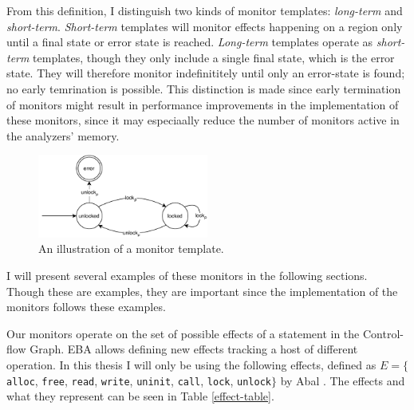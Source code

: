 \newpar From this definition, I distinguish two kinds of monitor templates: \textit{long-term} and \textit{short-term}. \textit{Short-term} templates will monitor effects happening on a region only until a final state or error state is reached. \textit{Long-term} templates operate as \textit{short-term} templates, though they only include a single final state, which is the error state. They will therefore monitor indefinititely until only an error-state is found; no early temrination is possible. This distinction is made since early termination of monitors might result in performance improvements in the implementation of these monitors, since it may especiaally reduce the number of monitors active in the analyzers' memory. 

\begin{figure}[H]
    \centering
    \includegraphics[width=0.5\textwidth]{algorithm/figures/double-unlock}
    \caption{An illustration of a monitor template.}
    \label{double-unlock-automata-intro}
\end{figure}

\newpar I will present several examples of these monitors in the following sections. Though these are examples, they are important since the implementation of the monitors follows these examples. 

\newpar Our monitors operate on the set of possible effects of a statement in the Control-flow Graph. EBA allows defining new effects tracking a host of different operation. In this thesis I will only be using the following effects, defined as $E = \{$\texttt{alloc}, \texttt{free}, \texttt{read}, \texttt{write}, \texttt{uninit}, \texttt{call}, \texttt{lock}, \texttt{unlock}$\}$ by Abal \cite{EffectiveBugFinding}. The effects and what they represent can be seen in Table \ref{effect-table}.

